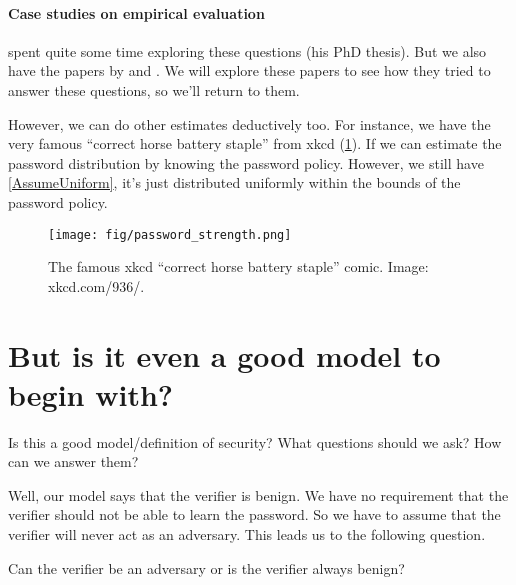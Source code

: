 \paragraph{Case studies on empirical evaluation}

\Textcite{GuessingHumanChosenSecrets2012} spent quite some time exploring these 
questions (his PhD thesis).
But we also have the papers by
\textcite{OfPasswordsAndPeople} and
\textcite{CanLongPasswordsBeSecureAndUsable}.
We will explore these papers to see how they tried to answer these questions, 
so we'll return to them.

However, we can do other estimates deductively too.
For instance, we have the very famous \enquote{correct horse battery staple} 
from xkcd (\cref{xkcd936}).
If we can estimate the password distribution by knowing the password policy.
However, we still have \cref{AssumeUniform}, it's just distributed uniformly 
within the bounds of the password policy.

\begin{frame}
  \begin{figure}[h]
    \texttt{[image: fig/password\_strength.png]}
    \caption{%
      The famous xkcd \enquote{correct horse battery staple} comic.
      Image: xkcd.com/936/.
    }\label{xkcd936}
  \end{figure}
\end{frame}

\section{But is it even a good model to begin with?}

\begin{frame}
  \begin{exercise}
    Is this a good model/definition of security?
    What questions should we ask?
    How can we answer them?
  \end{exercise}
\end{frame}

Well, our model says that the verifier is benign.
We have no requirement that the verifier should not be able to learn the 
password.
So we have to assume that the verifier will never act as an adversary.
This leads us to the following question.

\begin{frame}
  \begin{question}
    Can the verifier be an adversary or is the verifier always benign?
  \end{question}
\end{frame}

